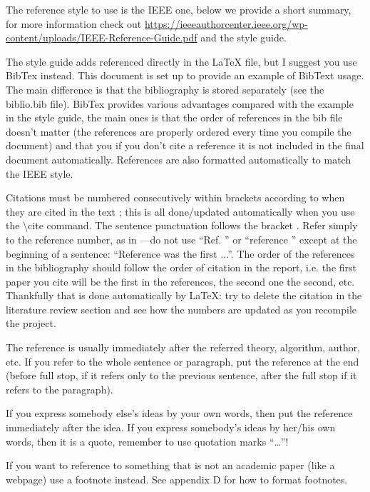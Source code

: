 \documentclass[conference]{IEEEtran}
\begin{document}
The reference style to use is the IEEE one, below we provide a short summary, for more information check out \url{https://ieeeauthorcenter.ieee.org/wp-content/uploads/IEEE-Reference-Guide.pdf} and the style guide.

The style guide adds referenced directly in the LaTeX file, but I suggest you use BibTex instead. This document is set up to provide an example of BibText usage. The main difference is that the bibliography is stored separately (see the biblio.bib file). BibTex provides various advantages compared with the example in the style guide, the main ones is that the order of references in the bib file doesn't matter (the references are properly ordered every time you compile the document) and that you if you don't cite a reference it is not included in the final document automatically. References are also formatted automatically to match the IEEE style.

Citations must be numbered consecutively within brackets according to when they are cited in the text \cite{Nobody06}; this is all done/updated automatically when you use the \textbackslash cite command. The sentence punctuation follows the bracket \cite{Nobody06}. Refer simply to the reference number, as in \cite{Nobody07}—do not use “Ref. \cite{Nobody07}” or “reference  \cite{Nobody07}” except at the beginning of a sentence: “Reference \cite{Nobody07} was the first ...”. The order of the references in the bibliography should follow the order of citation in the report, i.e. the first paper you cite will be the first in the references, the second one the second, etc. Thankfully that is done automatically by LaTeX: try to delete the citation in the literature review section and see how the numbers are updated as you recompile the project.

The reference is usually immediately after the referred theory, algorithm, author, etc. If you refer to the whole sentence or paragraph, put the reference at the end (before full stop, if it refers only to the previous sentence, after the full stop if it refers to the paragraph).

If you express somebody else’s ideas by your own words, then put the reference immediately after the idea. If you express somebody’s ideas by her/his own words, then it is a quote, remember to use quotation marks “…”!

If you want to reference to something that is not an academic paper (like a webpage) use a footnote instead. See appendix D for how to format footnotes.
\end{document}
